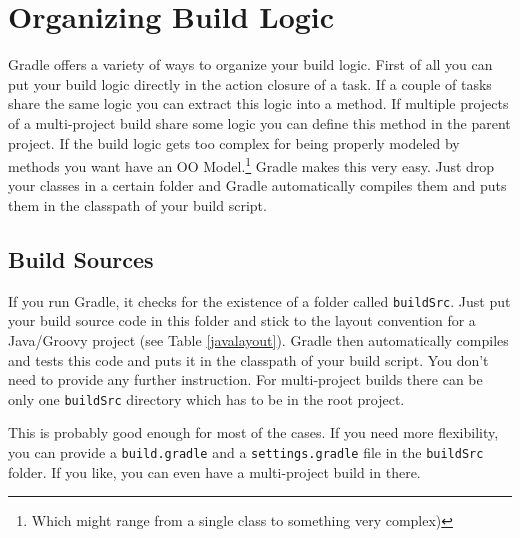 \chapter{Organizing Build Logic} %
\label{cha:organizing_build_logic}
Gradle offers a variety of ways to organize your build logic. First of all you can put your build logic directly in the action closure of a task. If a couple of tasks share the same logic you can extract this logic into a method. If multiple projects of a multi-project build share some logic you can define this method in the parent project. If the build logic gets too complex for being properly modeled by methods you want have an OO Model.\footnote{Which might range from a single class to something very complex)} Gradle makes this very easy. Just drop your classes in a certain folder and Gradle automatically compiles them and puts them in the classpath of your build script.

\section{Build Sources} %
\label{sec:build_sources}
If you run Gradle, it checks for the existence of a folder called \texttt{buildSrc}. Just put your build source code in this folder and stick to the layout convention for a Java/Groovy project (see Table \ref{javalayout}). Gradle then automatically compiles and tests this code and puts it in the classpath of your build script. You don't need to provide any further instruction. For multi-project builds there can be only one \texttt{buildSrc} directory which has to be in the root project.

This is probably good enough for most of the cases. If you need more flexibility, you can provide a \texttt{build.gradle} and a \texttt{settings.gradle} file in the \texttt{buildSrc} folder. If you like, you can even have a multi-project build in there.


